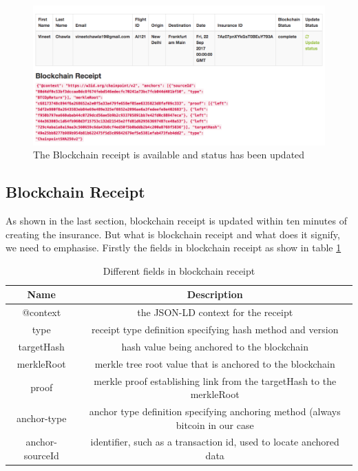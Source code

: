 \begin{figure}[h]
    \centering
    \includegraphics[width=\textwidth]{Figures/complete_dashboard.png}
    \caption{The Blockchain receipt is available and status has been updated}
    \label{fig:complete_dashboard}
\end{figure}

\subsection{Blockchain Receipt}
As shown in the last section, blockchain receipt is updated within ten minutes of creating the insurance. But what is blockchain receipt and what does it signify, we need to emphasise. Firstly the fields in blockchain receipt as show in table \ref{table:receipt}

\begin{table}[h!]
\centering
\begin{tabular}{||c c||} 
 \hline
 Name & Description  \\ [0.5ex] 
 \hline\hline
@context & the JSON-LD context for the receipt \\ 
\hline
type & receipt type definition specifying hash method and version \\
\hline
targetHash & hash value being anchored to the blockchain \\
\hline
merkleRoot	& merkle tree root value that is anchored to the blockchain \\
\hline
proof	& merkle proof establishing link from the targetHash to the merkleRoot \\
\hline
anchor-type	& anchor type definition specifying anchoring method (always bitcoin in our case \\
\hline
anchor-sourceId &	identifier, such as a transaction id, used to locate anchored data \\ [1ex]
 \hline
\end{tabular}
\caption{Different fields in blockchain receipt}
\label{table:receipt}
\end{table}

